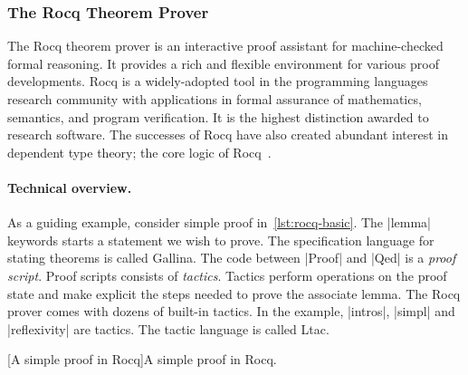 \subsubsection{The Rocq Theorem Prover}
\label{subsec:rocq}

The Rocq theorem prover is an interactive proof assistant for machine-checked formal reasoning.
It provides a rich and flexible environment for various proof developments.
Rocq is a widely-adopted tool in the programming languages research community with applications in formal assurance of mathematics, semantics, and program verification.
It is the highest distinction awarded to research software.
The successes of Rocq have also created abundant interest in dependent type theory;
the core logic of Rocq~\cite{coquand1988}.


\paragraph*{Technical overview.}
As a guiding example, consider simple proof in~\autoref{lst:rocq-basic}.
The \pr|lemma| keywords starts a statement we wish to prove.
The specification language for stating theorems is called Gallina.
The code between \pr|Proof| and \pr|Qed| is a \emph{proof script}.
Proof scripts consists of \emph{tactics}.
Tactics perform operations on the proof state and make explicit the steps needed to prove the associate lemma.
The Rocq prover comes with dozens of built-in tactics.
In the example, \pr|intros|, \pr|simpl| and \pr|reflexivity| are tactics.
The tactic language is called Ltac.

\begin{center}
\begin{minipage}{\textwidth}
\captionsetup{type=lstlisting}
[A simple proof in Rocq]{A simple proof in Rocq.}
\label{lst:rocq-basic}
\end{minipage}
\end{center}

